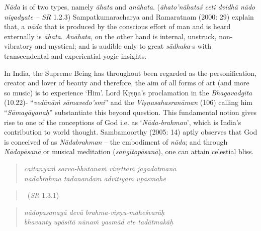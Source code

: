 \textit{Nāda} is of two types, namely \textit{āhata} and \textit{anāhata}. (\textit{āhato’nāhataś ceti dvidhā nādo nigadyate – SR} 1.2.3) Sampatkumaracharya and Ramaratnam (2000: 29) explain that, a \textit{nāda} that is produced by the conscious effort of man and is heard externally is \textit{āhata}. \textit{Anāhata}, on the other hand is internal, unstruck, non-vibratory and mystical; and is audible only to great \textit{sādhaka}-s with transcendental and experiential yogic insights.

In India, the Supreme Being has throughout been regarded as the personification, creator and lover of beauty and therefore, the aim of all forms of art (and more so music) is to experience ‘Him’. Lord Kṛṣṇa’s proclamation in the \textit{Bhagavadgīta} (10.22)- “\textit{vedānāṁ sāmavedo’smi}” and the \textit{Viṣṇusahasranāman} (106) calling him “\textit{Sāmagāyanaḥ}” substantiate this beyond question. This fundamental notion gives rise to one of the conceptions of God i.e. as ‘\textit{Nāda-brahman}’, which is India’s contribution to world thought. Sambamoorthy (2005: 14) aptly observes that God is conceived of as \textit{Nādabrahman} – the embodiment of \textit{nāda}; and through \textit{Nādopāsanā} or musical meditation (\textit{saṅgītopāsanā}), one can attain celestial bliss.

\begin{verse}
\textit{caitanyaṁ sarva-bhūtānāṁ vivṛttaṁ jagadātmanā} \\ \textit{nādabrahma tadānandam advitīyam upāsmahe }
\end{verse}

\vspace{-.5cm}

\begin{verse}

~\hfill (\textit{SR} 1.3.1)
\end{verse}

\begin{verse}
\textit{nādopasanayā devā brahma-viṣṇu-maheśvarāḥ }\\ \textit{bhavanty upāsitā nūnaṁ yasmād ete tadātmakāḥ }
\end{verse}

